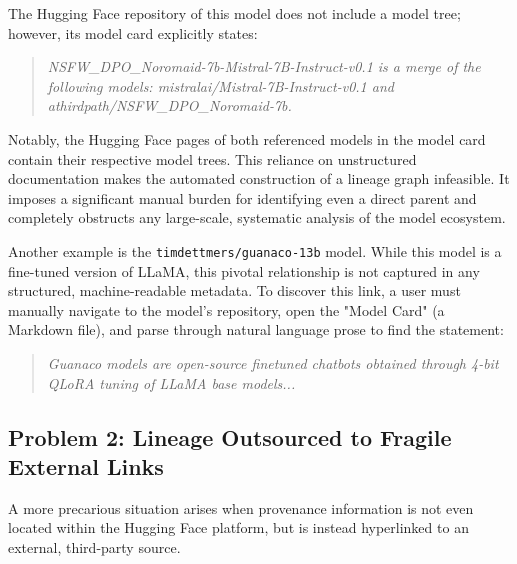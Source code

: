\begin{tcolorbox}[
        title={\textbf{Case Study 1: \texttt{DavidAU/NSFW\_DPO\_Noromaid-7b-GGUF}}},
        colback=gray!5!white,
        colframe=gray!75!black,
        fonttitle=\bfseries,
        sharp corners
    ]
    The Hugging Face repository of this model does not include a model tree; however, its model card explicitly states:
    \begin{quote}
        \textit{NSFW\_DPO\_Noromaid-7b-Mistral-7B-Instruct-v0.1 is a merge of the following models: mistralai/Mistral-7B-Instruct-v0.1 and athirdpath/NSFW\_DPO\_Noromaid-7b.}
    \end{quote}
    Notably, the Hugging Face pages of both referenced models in the model card contain their respective model trees. This reliance on unstructured documentation makes the automated construction of a lineage graph infeasible. It imposes a significant manual burden for identifying even a direct parent and completely obstructs any large-scale, systematic analysis of the model ecosystem.
\end{tcolorbox}

\begin{tcolorbox}[
        title={\textbf{Case Study 2: \texttt{timdettmers/guanaco-13b}}},
        colback=gray!5!white,
        colframe=gray!75!black,
        fonttitle=\bfseries,
        sharp corners
    ]
    Another example is the \texttt{timdettmers/guanaco-13b} model. While this model is a fine-tuned version of LLaMA, this pivotal relationship is not captured in any structured, machine-readable metadata. To discover this link, a user must manually navigate to the model's repository, open the "Model Card" (a Markdown file), and parse through natural language prose to find the statement:
    \begin{quote}
        \textit{Guanaco models are open-source finetuned chatbots obtained through 4-bit QLoRA tuning of LLaMA base models...}
    \end{quote}
\end{tcolorbox}

\subsection{Problem 2: Lineage Outsourced to Fragile External Links}
A more precarious situation arises when provenance information is not even located within the Hugging Face platform, but is instead hyperlinked to an external, third-party source.

